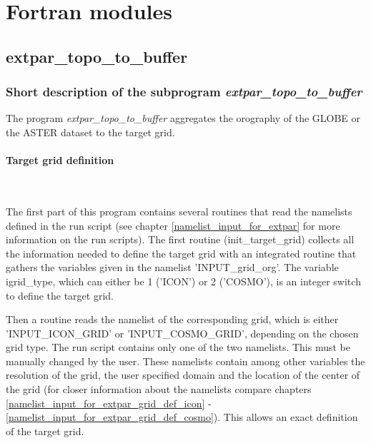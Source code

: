 \documentclass[a4paper,10pt,DIV14,BCOR1cm,titlepage,twoside]{scrartcl}
\begin{document}
\clearpage

\section{Fortran modules}\label{Fortran programmes}
\subsection{extpar\_topo\_to\_buffer}\label{extpar_topo_to_buffer}
\subsubsection{Short description of the subprogram \textit{extpar\_topo\_to\_buffer}}
The program \textit{extpar\_topo\_to\_buffer} aggregates the orography of the GLOBE or the ASTER dataset to the target grid.
\paragraph{Target grid definition}\ \par\medskip\noindent
The first part of this program contains several routines that read the namelists defined in the run script (see chapter \ref{namelist_input_for_extpar} for more information on the run scripts). The first routine (init\_target\_grid) collects all the information needed to define the target grid with an integrated routine that gathers the variables given in the namelist 'INPUT\_grid\_org'. The variable igrid\_type, which can either be 1 ('ICON') or 2 ('COSMO'), is an integer switch to define the target grid. \par\medskip\noindent
Then a routine reads the namelist of the corresponding grid, which is either 'INPUT\_ICON\_GRID' or 'INPUT\_COSMO\_GRID', depending on the chosen grid type. The run script contains only one of the two namelists. This must be manually changed by the user. These namelists contain among other variables the resolution of the grid, the user specified domain and the location of the center of the grid (for closer information about the namelists compare chapters \ref{namelist_input_for_extpar_grid_def_icon} - \ref{namelist_input_for_extpar_grid_def_cosmo}). This allows an exact definition of the target grid. \par\medskip\noindent
\end{document}
